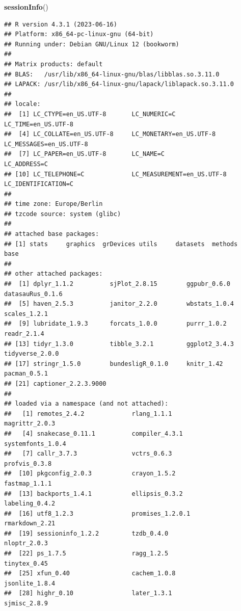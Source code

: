 \documentclass[
  12pt,
  oneside]{book}
\newenvironment{Shaded}{\begin{snugshade}}{\end{snugshade}}
\newcommand{\FunctionTok}[1]{\textcolor[rgb]{0.13,0.29,0.53}{\textbf{#1}}}
\newcommand{\NormalTok}[1]{#1}
\theoremstyle{definition}
\theoremstyle{definition}
\theoremstyle{definition}
\theoremstyle{definition}
\theoremstyle{remark}
\begin{document}
\begin{Shaded}
\begin{Highlighting}[]
\FunctionTok{sessionInfo}\NormalTok{()}
\end{Highlighting}
\end{Shaded}

\begin{verbatim}
## R version 4.3.1 (2023-06-16)
## Platform: x86_64-pc-linux-gnu (64-bit)
## Running under: Debian GNU/Linux 12 (bookworm)
## 
## Matrix products: default
## BLAS:   /usr/lib/x86_64-linux-gnu/blas/libblas.so.3.11.0 
## LAPACK: /usr/lib/x86_64-linux-gnu/lapack/liblapack.so.3.11.0
## 
## locale:
##  [1] LC_CTYPE=en_US.UTF-8       LC_NUMERIC=C               LC_TIME=en_US.UTF-8       
##  [4] LC_COLLATE=en_US.UTF-8     LC_MONETARY=en_US.UTF-8    LC_MESSAGES=en_US.UTF-8   
##  [7] LC_PAPER=en_US.UTF-8       LC_NAME=C                  LC_ADDRESS=C              
## [10] LC_TELEPHONE=C             LC_MEASUREMENT=en_US.UTF-8 LC_IDENTIFICATION=C       
## 
## time zone: Europe/Berlin
## tzcode source: system (glibc)
## 
## attached base packages:
## [1] stats     graphics  grDevices utils     datasets  methods   base     
## 
## other attached packages:
##  [1] dplyr_1.1.2          sjPlot_2.8.15        ggpubr_0.6.0         datasauRus_0.1.6    
##  [5] haven_2.5.3          janitor_2.2.0        wbstats_1.0.4        scales_1.2.1        
##  [9] lubridate_1.9.3      forcats_1.0.0        purrr_1.0.2          readr_2.1.4         
## [13] tidyr_1.3.0          tibble_3.2.1         ggplot2_3.4.3        tidyverse_2.0.0     
## [17] stringr_1.5.0        bundesligR_0.1.0     knitr_1.42           pacman_0.5.1        
## [21] captioner_2.2.3.9000
## 
## loaded via a namespace (and not attached):
##   [1] remotes_2.4.2             rlang_1.1.1               magrittr_2.0.3           
##   [4] snakecase_0.11.1          compiler_4.3.1            systemfonts_1.0.4        
##   [7] callr_3.7.3               vctrs_0.6.3               profvis_0.3.8            
##  [10] pkgconfig_2.0.3           crayon_1.5.2              fastmap_1.1.1            
##  [13] backports_1.4.1           ellipsis_0.3.2            labeling_0.4.2           
##  [16] utf8_1.2.3                promises_1.2.0.1          rmarkdown_2.21           
##  [19] sessioninfo_1.2.2         tzdb_0.4.0                nloptr_2.0.3             
##  [22] ps_1.7.5                  ragg_1.2.5                tinytex_0.45             
##  [25] xfun_0.40                 cachem_1.0.8              jsonlite_1.8.4           
##  [28] highr_0.10                later_1.3.1               sjmisc_2.8.9             

\end{verbatim}
\end{document}

